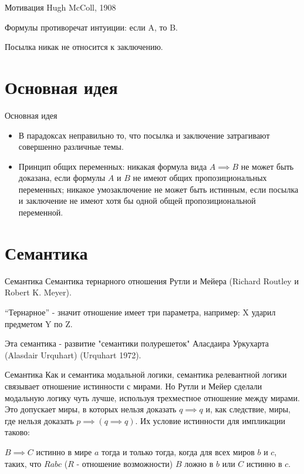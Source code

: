 \documentclass[14pt]{beamer}
\begin{document}
\begin{frame}[nologo]{Мотивация}
	Hugh McColl, 1908
	
	Формулы противоречат интуиции: если A, то B.
	
	Посылка никак не относится к заключению.
\end{frame}

\section{Основная идея}

\begin{frame}[nologo]{Основная идея}
	\begin{itemize}
		\item В парадоксах неправильно то, что посылка и заключение затрагивают 
		совершенно различные темы.
		\item Принцип общих переменных: никакая формула вида $ A \implies B $ 
		не может быть доказана, если формулы $ A $ и $ B $ не имеют общих 
		пропозициональных переменных; никакое умозаключение не может быть 
		истинным, если посылка и заключение не имеют хотя бы одной общей 
		пропозициональной переменной.
	\end{itemize}
\end{frame}

\section{Семантика}

\begin{frame}[nologo]{Семантика}
Семантика тернарного отношения Рутли и Мейера (Richard Routley и Robert K. 
Meyer).

``Тернарное'' - значит отношение имеет три параметра, например: X ударил 
предметом Y по Z.

Эта семантика - развитие "семантики полурешеток" Аласдаира Уркухарта (Alasdair 
Urquhart) (Urquhart 1972).
\end{frame}

\begin{frame}[nologo]{Семантика}
Как и семантика модальной логики, семантика релевантной логики связывает 
отношение истинности с мирами. Но Рутли и Мейер сделали модальную логику чуть 
лучше, используя трехместное отношение между мирами. Это допускает миры, в 
которых нельзя доказать $ q \implies q $ и, как следствие, миры, где нельзя 
доказать $ p \implies (q \implies q) $. Их условие истинности для импликации 
таково:

$ B \implies C $ истинно в мире $ a $ тогда и только тогда, когда для всех 
миров $ b $ и $ c $, таких, что $ Rabc $ ($ R $ - отношение возможности) $ B $ 
ложно в $ b $ или $ C $ истинно в $ c $.
\end{frame}
\end{document}
